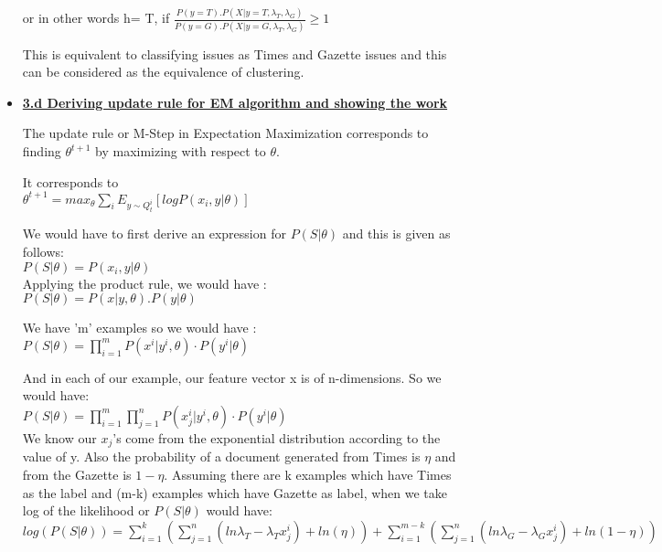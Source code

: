 \documentclass[11pt]{article}
\begin{document}
\begin{itemize}
	 or in other words
	 h= T, if $ \frac{P(y=T) . P(X| y=T, \lambda_T, \lambda_G  ) }{P(y=G) . P(X| y=G, \lambda_T, \lambda_G )} \geq 1 $
	 
	 This is equivalent to classifying issues as Times and Gazette issues and this can be considered as the equivalence of clustering.
	 
	 
	 \item[] \textbf{\underline{3.d  Deriving update rule for EM algorithm and showing the work}}
	 
	 The update rule or M-Step  in Expectation Maximization corresponds to finding $\theta^{t+1}$ by maximizing with respect to $\theta$.
	 
	 It corresponds to \\
	 
	 $\theta^{t+1}= max_\theta \sum_{i} E_{y \sim Q_{t}^{i}} [log P(x_i,y| \theta)] $
	 
	 We would have to first derive an expression for $P(S| \theta)$ and this is given as follows:\\
	 
	 $P(S| \theta) = P(x_i, y| \theta) $\\
	 Applying the product rule, we would have :\\
	 $P(S| \theta) = P(x|y,\theta). P(y | \theta)$
	 
	 We have 'm' examples so we would have :\\
	 $P(S| \theta) = \prod_{i=1}^{m} P(x^i | y^i, \theta) \cdot P(y^i | \theta) $
	 
	 And in each of our example, our feature vector x is of n-dimensions. So we would have:\\
	
	 $P(S| \theta) = \prod_{i=1}^{m}  \prod_{j=1}^{n} P(x^{i}_{j} | y^i, \theta) \cdot P(y^i | \theta) $ \\
	 
	 We know our $x_j$'s come from the exponential distribution according to the value of y. Also the probability of a document generated from Times is $\eta$ and from the Gazette is $1-\eta$. Assuming there are k examples which have Times as the label and (m-k) examples which have Gazette as label, when we take log of the likelihood or $P(S| \theta)$ would have:\\
	 
	  $ log(P(S| \theta)) = \sum_{i=1}^{k} ( \sum_{j=1}^{n} ( ln \lambda_T - \lambda_T x_{j}^{i} ) + ln(\eta) ) + \sum_{i=1}^{m-k} ( \sum_{j=1}^{n} ( ln \lambda_G  - \lambda_G x_{j}^{i}) + ln(1- \eta)  )$ 
	 

\end{itemize}
\end{document}
